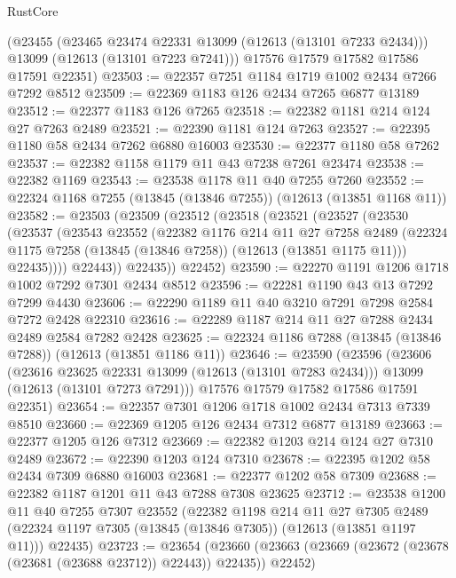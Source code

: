 \begin{lexlean}{RustCore}
\begin{coremodule}
      (@23455
        (@23465 @23474 @22331 @13099 (@12613 (@13101 @7233 @2434)))
        @13099
        (@12613 (@13101 @7223 @7241)))
      @17576
      @17579
      @17582
      @17586
      @17591
      @22351)
@23503 := @22357 @7251 @1184 @1719 @1002 @2434 @7266 @7292 @8512
@23509 := @22369 @1183 @126 @2434 @7265 @6877 @13189
@23512 := @22377 @1183 @126 @7265
@23518 := @22382 @1181 @214 @124 @27 @7263 @2489
@23521 := @22390 @1181 @124 @7263
@23527 := @22395 @1180 @58 @2434 @7262 @6880 @16003
@23530 := @22377 @1180 @58 @7262
@23537 := @22382 @1158 @1179 @11 @43 @7238 @7261 @23474
@23538 := @22382 @1169
@23543 := @23538 @1178 @11 @40 @7255 @7260
@23552 := @22324 @1168 @7255 (@13845 (@13846 @7255)) (@12613 (@13851 @1168 @11))
@23582 := @23503
    (@23509
      (@23512
        (@23518
          (@23521
            (@23527
              (@23530
                (@23537
                  (@23543
                    @23552
                    (@22382
                      @1176
                      @214
                      @11
                      @27
                      @7258
                      @2489
                      (@22324 @1175 @7258 (@13845 (@13846 @7258)) (@12613 (@13851 @1175 @11)))
                      @22435))))
              @22443))
          @22435))
      @22452)
@23590 := @22270 @1191 @1206 @1718 @1002 @7292 @7301 @2434 @8512
@23596 := @22281 @1190 @43 @13 @7292 @7299 @4430
@23606 := @22290 @1189 @11 @40 @3210 @7291 @7298 @2584 @7272 @2428 @22310
@23616 := @22289 @1187 @214 @11 @27 @7288 @2434 @2489 @2584 @7282 @2428
@23625 := @22324 @1186 @7288 (@13845 (@13846 @7288)) (@12613 (@13851 @1186 @11))
@23646 := @23590
    (@23596
      (@23606
        (@23616 @23625 @22331 @13099 (@12613 (@13101 @7283 @2434)))
        @13099
        (@12613 (@13101 @7273 @7291)))
      @17576
      @17579
      @17582
      @17586
      @17591
      @22351)
@23654 := @22357 @7301 @1206 @1718 @1002 @2434 @7313 @7339 @8510
@23660 := @22369 @1205 @126 @2434 @7312 @6877 @13189
@23663 := @22377 @1205 @126 @7312
@23669 := @22382 @1203 @214 @124 @27 @7310 @2489
@23672 := @22390 @1203 @124 @7310
@23678 := @22395 @1202 @58 @2434 @7309 @6880 @16003
@23681 := @22377 @1202 @58 @7309
@23688 := @22382 @1187 @1201 @11 @43 @7288 @7308 @23625
@23712 := @23538
    @1200
    @11
    @40
    @7255
    @7307
    @23552
    (@22382
      @1198
      @214
      @11
      @27
      @7305
      @2489
      (@22324 @1197 @7305 (@13845 (@13846 @7305)) (@12613 (@13851 @1197 @11)))
      @22435)
@23723 := @23654
    (@23660 (@23663 (@23669 (@23672 (@23678 (@23681 (@23688 @23712)) @22443)) @22435)) @22452)

\end{coremodule}
\end{lexlean}

